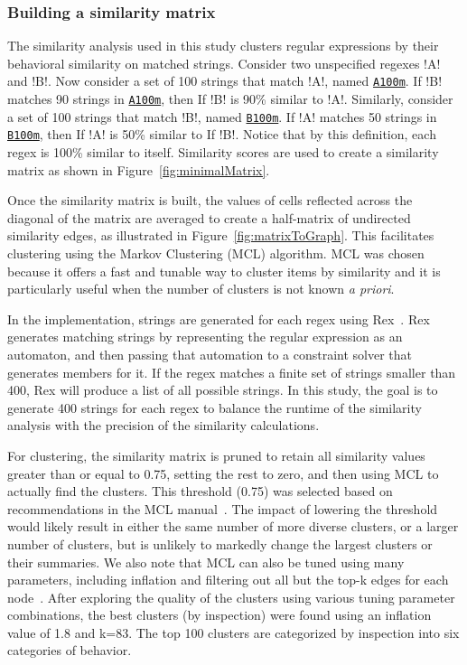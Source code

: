 \subsubsection{Building a similarity matrix}
\label{sec:buildingSimilarity}
The similarity analysis used in this study clusters regular expressions by their behavioral similarity on matched strings.  Consider two unspecified regexes \cverb!A! and \cverb!B!.
Now consider a set of 100 strings that match \cverb!A!, named \underline{\tt A100m}.  If \cverb!B! matches 90 strings in \underline{\tt A100m}, then If \cverb!B! is 90\% similar to \cverb!A!.  Similarly, consider a set of 100 strings that match \cverb!B!, named \underline{\tt B100m}.  If \cverb!A! matches 50 strings in \underline{\tt B100m}, then If \cverb!A! is 50\% similar to If \cverb!B!.  Notice that by this definition, each regex is 100\% similar to itself.  Similarity scores are used to create a similarity matrix as shown in Figure~\ref{fig:minimalMatrix}.

Once the similarity matrix is built, the values of cells reflected across the diagonal of the matrix are averaged to create a half-matrix of undirected similarity edges, as illustrated in Figure~\ref{fig:matrixToGraph}.
This facilitates clustering using the  Markov Clustering (MCL) algorithm.
MCL was chosen because it offers a fast and tunable way to cluster items by similarity and it is particularly useful when the number of clusters is not known \emph{a priori}.


In the implementation, strings are generated for each regex using Rex~.  Rex generates matching strings by representing the regular expression as an automaton, and then passing that automation to a constraint solver that generates members for it.  If the regex matches a finite set of strings smaller than 400, Rex will produce a list of all possible strings.
In this study, the goal is to generate 400 strings for each regex to balance the runtime of the similarity analysis with the precision of the similarity calculations.

For clustering, the similarity matrix is pruned to retain all similarity values greater than or equal to 0.75, setting the rest to zero, and then using MCL to actually find the clusters.
This threshold (0.75) was selected based on recommendations in the MCL manual~. The impact of lowering the threshold would likely result  in either the same number of more diverse clusters, or a larger number of clusters, but is unlikely to markedly change the largest clusters or their summaries.
We also note that MCL can also be tuned using many parameters, including inflation and filtering out all but the top-k edges for each node~.
After exploring the quality of the clusters using various tuning parameter combinations, the best clusters (by inspection) were found using an inflation value of 1.8 and k=83.   The top 100 clusters are categorized by inspection into six categories of behavior.

